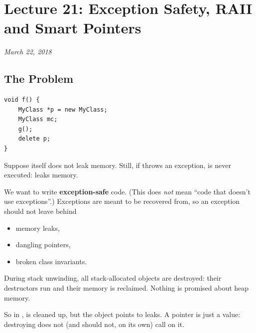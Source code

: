 \chapter{Lecture 21: Exception Safety, RAII and Smart Pointers}
\begin{center}
\textit{March 22, 2018}
\end{center}

\section{The Problem}
\begin{lstlisting}[style=cpp]
void f() {
    MyClass *p = new MyClass;
    MyClass mc;
    g();
    delete p;
}
\end{lstlisting}
Suppose  itself does not leak memory. Still, if  throws an
exception,  is never executed:  leaks memory.

We want to write \textbf{exception-safe} code. (This does \emph{not} mean ``code
that doesn't use exceptions''.) Exceptions are meant to be recovered from, so an
exception should not leave behind
\begin{itemize}
  \item memory leaks,
  \item dangling pointers,
  \item broken class invariants.
\end{itemize}

\begin{important}[C++ guarantee]
During stack unwinding, all stack-allocated objects are destroyed: their
destructors run and their memory is reclaimed. Nothing is promised about heap
memory.
\end{important}
So in ,  is cleaned up, but the object  points to leaks.
A pointer is just a value: destroying  does not (and should not, on its
own) call  on it.
\begin{center}
\end{center}


